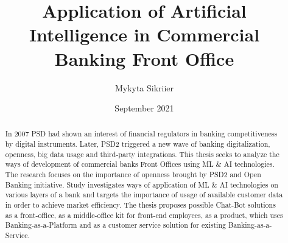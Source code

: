 \documentclass{master_thesis}
\author{Mykyta Sikriier}
\title{
    Application of Artificial Intelligence in Commercial Banking Front Office
}
\date{September 2021}
\begin{document}
\maketitle

\begin{abstract}
    In 2007 PSD had shown an interest of financial regulators in banking competitiveness by digital instruments.
    Later, PSD2 triggered a new wave of banking digitalization, openness, big data usage and third-party integrations.
    This thesis seeks to analyze the ways of development of commercial banks Front Offices using ML \& AI technologies.
    The research focuses on the importance of openness brought by PSD2 and Open Banking initiative.
    Study investigates ways of application of ML \& AI technologies on various layers of a bank and 
    targets the importance of usage of available customer data in order to achieve market efficiency.
    The thesis proposes possible Chat-Bot solutions as a front-office, as a middle-office kit for front-end employees,
    as a product, which uses Banking-as-a-Platform and as a customer service solution for existing Banking-as-a-Service.
\end{abstract}

\tableofcontents
















\end{document}
